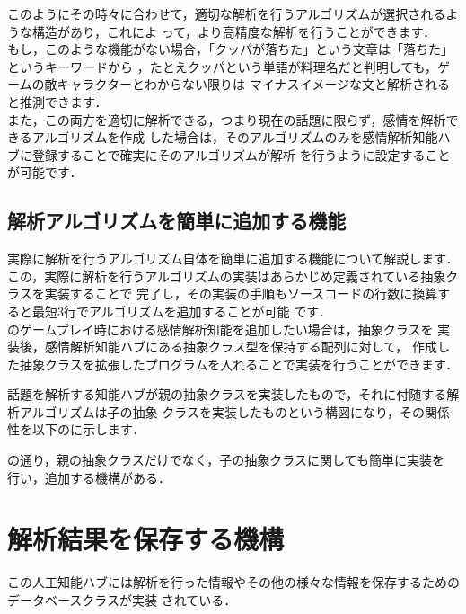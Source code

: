 このようにその時々に合わせて，適切な解析を行うアルゴリズムが選択されるような構造があり，これによ
って，より高精度な解析を行うことができます．\\

もし，このような機能がない場合，「クッパが落ちた」という文章は「落ちた」というキーワードから
，たとえクッパという単語が料理名だと判明しても，ゲームの敵キャラクターとわからない限りは
マイナスイメージな文と解析されると推測できます．\\

また，この両方を適切に解析できる，つまり現在の話題に限らず，感情を解析できるアルゴリズムを作成
した場合は，そのアルゴリズムのみを感情解析知能ハブに登録することで確実にそのアルゴリズムが解析
を行うように設定することが可能です．

\subsection{解析アルゴリズムを簡単に追加する機能}
実際に解析を行うアルゴリズム自体を簡単に追加する機能について解説します．\\
この，実際に解析を行うアルゴリズムの実装はあらかじめ定義されている抽象クラスを実装することで
完了し，その実装の手順もソースコードの行数に換算すると最短3行でアルゴリズムを追加することが可能
です．\\

のゲームプレイ時における感情解析知能を追加したい場合は，抽象クラスを
実装後，感情解析知能ハブにある抽象クラス型を保持する配列に対して，
作成した抽象クラスを拡張したプログラムを入れることで実装を行うことができます．

話題を解析する知能ハブが親の抽象クラスを実装したもので，それに付随する解析アルゴリズムは子の抽象
クラスを実装したものという構図になり，その関係性を以下のに示します．


の通り，親の抽象クラスだけでなく，子の抽象クラスに関しても簡単に実装を
行い，追加する機構がある．

\newpage

\section{解析結果を保存する機構}
この人工知能ハブには解析を行った情報やその他の様々な情報を保存するためのデータベースクラスが実装
されている．\\

